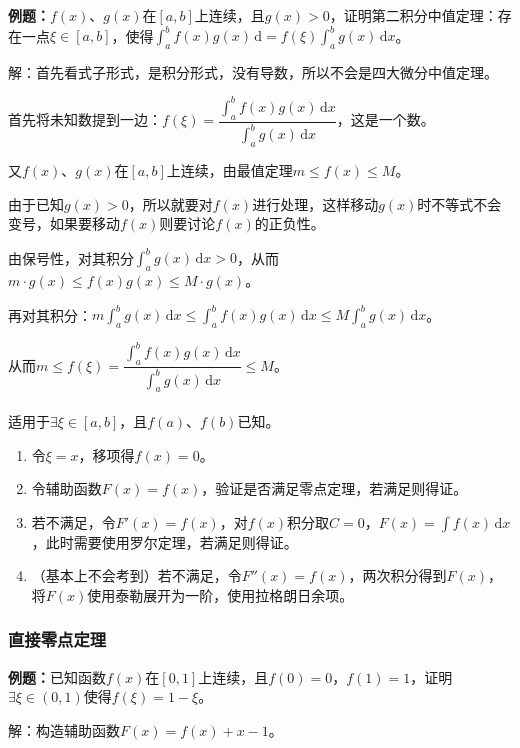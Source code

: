 \textbf{例题：}$f(x)$、$g(x)$在$[a,b]$上连续，且$g(x)>0$，证明第二积分中值定理：存在一点$\xi\in[a,b]$，使得$\int_a^bf(x)g(x)\,\textrm{d}=f(\xi)\int_a^bg(x)\,\textrm{d}x$。

解：首先看式子形式，是积分形式，没有导数，所以不会是四大微分中值定理。

首先将未知数提到一边：$f(\xi)=\dfrac{\int_a^bf(x)g(x)\,\textrm{d}x}{\int_a^bg(x)\,\textrm{d}x}$，这是一个数。

又$f(x)$、$g(x)$在$[a,b]$上连续，由最值定理$m\leqslant f(x)\leqslant M$。

由于已知$g(x)>0$，所以就要对$f(x)$进行处理，这样移动$g(x)$时不等式不会变号，如果要移动$f(x)$则要讨论$f(x)$的正负性。

由保号性，对其积分$\int_a^bg(x)\,\textrm{d}x>0$，从而$m\cdot g(x)\leqslant f(x)g(x)\leqslant M\cdot g(x)$。

再对其积分：$m\int_a^bg(x)\,\textrm{d}x\leqslant\int_a^bf(x)g(x)\,\textrm{d}x\leqslant M\int_a^bg(x)\,\textrm{d}x$。

从而$m\leqslant f(\xi)=\dfrac{\int_a^bf(x)g(x)\,\textrm{d}x}{\int_a^bg(x)\,\textrm{d}x}\leqslant M$。

\paragraph{}

适用于$\exists\xi\in[a,b]$，且$f(a)$、$f(b)$已知。

\begin{enumerate}
    \item 令$\xi=x$，移项得$f(x)=0$。
    \item 令辅助函数$F(x)=f(x)$，验证是否满足零点定理，若满足则得证。
    \item 若不满足，令$F'(x)=f(x)$，对$f(x)$积分取$C=0$，$F(x)=\int f(x)\,\textrm{d}x$，此时需要使用罗尔定理，若满足则得证。
    \item （基本上不会考到）若不满足，令$F''(x)=f(x)$，两次积分得到$F(x)$，将$F(x)$使用泰勒展开为一阶，使用拉格朗日余项。
\end{enumerate}

\subsubsection{直接零点定理}

\textbf{例题：}已知函数$f(x)$在$[0,1]$上连续，且$f(0)=0$，$f(1)=1$，证明$\exists\xi\in(0,1)$使得$f(\xi)=1-\xi$。

解：构造辅助函数$F(x)=f(x)+x-1$。

